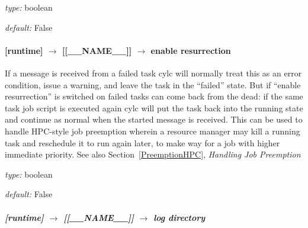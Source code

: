 \begin{myitemize}
\item {\em type:} boolean
\item {\em default:} False
\end{myitemize}



\paragraph[enable resurrection]{ [runtime] $\rightarrow$ [[\_\_NAME\_\_]] $\rightarrow$ enable resurrection}

If a message is received from a failed task cylc will normally treat
this as an error condition, issue a warning, and leave the task in the
``failed'' state.  But if ``enable resurrection'' is switched on failed
tasks can come back from the dead: if the same task job script is
executed again cylc will put the task back into the running state and
continue as normal when the started message is received. This can be
used to handle HPC-style job preemption wherein a resource manager may
kill a running task and reschedule it to run again later, to make way
for a job with higher immediate priority. See also
Section~\ref{PreemptionHPC}, {\em Handling Job Preemption}
\begin{myitemize}
\item {\em type:} boolean
\item {\em default:} False
\end{myitemize}


\subparagraph[log directory]{[runtime] $\rightarrow$ [[\_\_NAME\_\_]] $\rightarrow$ log directory}
\label{LocalLog}

